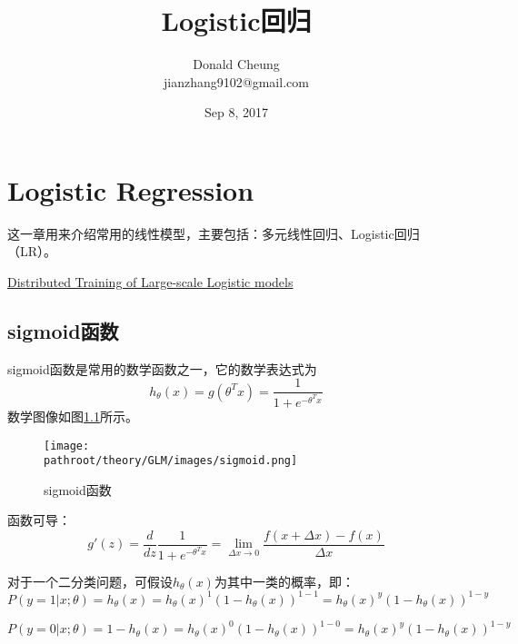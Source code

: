 \documentclass[10pt,a4paper]{ctexbook}
\providecommand{\pathroot}{../..}
\begin{document}
    \setlength{\baselineskip}{20pt}
    \title{Logistic回归}
    \author{Donald Cheung\\jianzhang9102@gmail.com}
    \date{Sep 8, 2017}
    \tableofcontents
\fi

\chapter{Logistic Regression}
这一章用来介绍常用的线性模型，主要包括：多元线性回归、Logistic回归（LR）。

\href{http://www.cs.cmu.edu/~sgopal1/papers/ICML13.pdf}{Distributed Training of Large-scale Logistic models}

\section{sigmoid函数}
sigmoid函数是常用的数学函数之一，它的数学表达式为
\[
    h_{\theta}(x)=g({\theta}^Tx)={\frac {1}{1+e^{-\theta^Tx}}}
\]
数学图像如图\ref{fig:sigmoid}所示。

\begin{figure}[ht]
    \centering
    \texttt{[image: \\pathroot/theory/GLM/images/sigmoid.png]}
    \caption{sigmoid函数}
    \label{fig:sigmoid}
\end{figure}

函数可导：
\[
g'(z)={\frac {d}{dz}}{\frac {1}{1+e^{-\theta^Tx}}}=\lim_{{\Delta x}\to 0}{\frac {f(x+{\Delta x})-f(x)}{\Delta x}}
\]

对于一个二分类问题，可假设$h_{\theta}(x)$为其中一类的概率，即：
\[
P(y=1|x;\theta)=h_{\theta}(x)
               =h_{\theta}(x)^{1}(1-h_{\theta}(x))^{1-1}
               =h_{\theta}(x)^{y}(1-h_{\theta}(x))^{1-y}
\]

\[
P(y=0|x;\theta)=1-h_{\theta}(x)
               =h_{\theta}(x)^{0}(1-h_{\theta}(x))^{1-0}
               =h_{\theta}(x)^{y}(1-h_{\theta}(x))^{1-y}
\]
\end{document}
